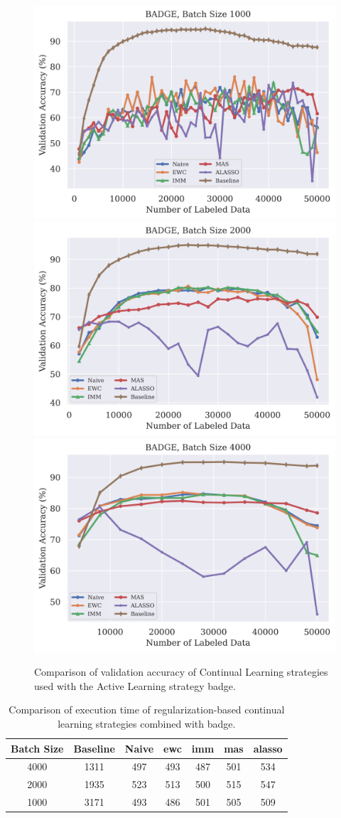 \begin{figure}[h]
    \centering
    \includegraphics[width=0.32\linewidth]{images/results_CAL/badge_1000b_acc.png} \hfill
    \includegraphics[width=0.32\linewidth]{images/results_CAL/badge_2000b_acc.png} \hfill
    \includegraphics[width=0.32\linewidth]{images/results_CAL/badge_4000b_acc.png}
    \caption[Continual Active Learning with \gls{badge} with varying batch size]{Comparison of validation accuracy of Continual Learning strategies used with the Active Learning strategy
    \gls{badge}.}
    \label{fig:Evaluation:Results:CAL:VaryBatchSizeAcc}
\end{figure}


\begin{table}[h]
    \centering
    \begin{tabular}{c | c c c c c c} 
        Batch Size & Baseline & Naive & \gls{ewc} & \gls{imm} & \gls{mas} & \gls{alasso}\\ 
        \hline 
        4000 & 1311 & 497 & 493 & 487 & 501 & 534 \\
        2000 & 1935 & 523 & 513 & 500 & 515 & 547 \\
        1000 & 3171 & 493 & 486 & 501 & 505 & 509 \\
    \end{tabular}
    \caption{Comparison of execution time of regularization-based continual learning strategies
    combined with \gls{badge}.}
    \label{fig:Evaluation:CAL:BadgeVaryBatchSizeTime}
\end{table}



